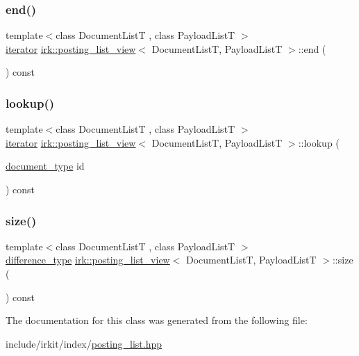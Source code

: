 \subsubsection{\texorpdfstring{end()}{end()}}
{\footnotesize\ttfamily template$<$class Document\+ListT , class Payload\+ListT $>$ \\
\mbox{\hyperlink{classirk_1_1posting__list__view_1_1iterator}{iterator}} \mbox{\hyperlink{classirk_1_1posting__list__view}{irk\+::posting\+\_\+list\+\_\+view}}$<$ Document\+ListT, Payload\+ListT $>$\+::end (\begin{DoxyParamCaption}{ }\end{DoxyParamCaption}) const\hspace{0.3cm}{\ttfamily [inline]}}

\mbox{\label{classirk_1_1posting__list__view_a2078e1a0c33d66cb0aa609fb8937911c}} 
\subsubsection{\texorpdfstring{lookup()}{lookup()}}
{\footnotesize\ttfamily template$<$class Document\+ListT , class Payload\+ListT $>$ \\
\mbox{\hyperlink{classirk_1_1posting__list__view_1_1iterator}{iterator}} \mbox{\hyperlink{classirk_1_1posting__list__view}{irk\+::posting\+\_\+list\+\_\+view}}$<$ Document\+ListT, Payload\+ListT $>$\+::lookup (\begin{DoxyParamCaption}\item[{\mbox{\hyperlink{classirk_1_1posting__list__view_ac4615e6e3d8ee1eb9a847b7a34919977}{document\+\_\+type}}}]{id }\end{DoxyParamCaption}) const\hspace{0.3cm}{\ttfamily [inline]}}

\mbox{\label{classirk_1_1posting__list__view_aad71ebe547caf256c8aab055c904ff19}} 
\subsubsection{\texorpdfstring{size()}{size()}}
{\footnotesize\ttfamily template$<$class Document\+ListT , class Payload\+ListT $>$ \\
\mbox{\hyperlink{classirk_1_1posting__list__view_aeae778b6aa26eadf11e1b799bb46547d}{difference\+\_\+type}} \mbox{\hyperlink{classirk_1_1posting__list__view}{irk\+::posting\+\_\+list\+\_\+view}}$<$ Document\+ListT, Payload\+ListT $>$\+::size (\begin{DoxyParamCaption}{ }\end{DoxyParamCaption}) const\hspace{0.3cm}{\ttfamily [inline]}}



The documentation for this class was generated from the following file\+:\begin{DoxyCompactItemize}
\item 
include/irkit/index/\mbox{\hyperlink{posting__list_8hpp}{posting\+\_\+list.\+hpp}}\end{DoxyCompactItemize}
